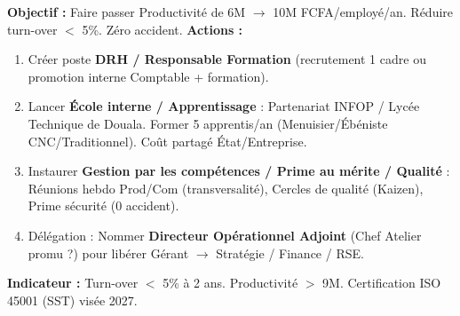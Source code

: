 \documentclass[11pt]{article}
\begin{document}
\begin{propriete}
\textbf{Objectif :} Faire passer Productivité de 6M $\rightarrow$ 10M FCFA/employé/an. Réduire turn-over $<$ 5\%. Zéro accident.
\textbf{Actions :}
\begin{enumerate}
    \item Créer poste \textbf{DRH / Responsable Formation} (recrutement 1 cadre ou promotion interne Comptable + formation).
    \item Lancer \textbf{École interne / Apprentissage} : Partenariat INFOP / Lycée Technique de Douala. Former 5 apprentis/an (Menuisier/Ébéniste CNC/Traditionnel). Coût partagé État/Entreprise.
    \item Instaurer \textbf{Gestion par les compétences / Prime au mérite / Qualité} : Réunions hebdo Prod/Com (transversalité), Cercles de qualité (Kaizen), Prime sécurité (0 accident).
    \item Délégation : Nommer \textbf{Directeur Opérationnel Adjoint} (Chef Atelier promu ?) pour libérer Gérant $\rightarrow$ Stratégie / Finance / RSE.
\end{enumerate}
\textbf{Indicateur :} Turn-over $<$ 5\% à 2 ans. Productivité $>$ 9M. Certification ISO 45001 (SST) visée 2027.
\end{propriete}
\end{document}
